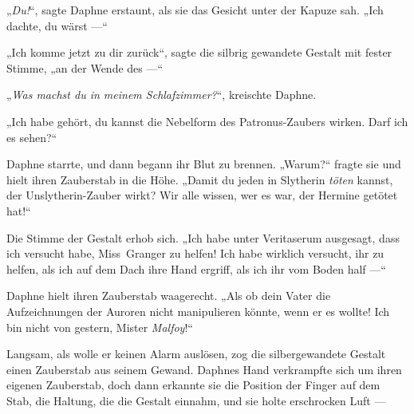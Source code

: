 „\emph{Du!}“, sagte Daphne erstaunt, als sie das Gesicht unter der Kapuze sah.
„Ich dachte, du wärst —“

„Ich komme jetzt zu dir zurück“, sagte die silbrig gewandete Gestalt mit fester Stimme, „an der Wende des —“

„\emph{Was machst du in meinem Schlafzimmer?}“, kreischte Daphne.

„Ich habe gehört, du kannst die Nebelform des Patronus-Zaubers wirken. Darf ich es sehen?“

Daphne starrte, und dann begann ihr Blut zu brennen.
„Warum?“ fragte sie und hielt ihren Zauberstab in die Höhe.
„Damit du jeden in Slytherin \emph{töten} kannst, der Unslytherin-Zauber wirkt? Wir alle wissen, wer es war, der Hermine getötet hat!“

Die Stimme der Gestalt erhob sich.
„Ich habe unter Veritaserum ausgesagt, dass ich versucht habe, Miss~Granger zu helfen! Ich habe wirklich versucht, ihr zu helfen, als ich auf dem Dach ihre Hand ergriff, als ich ihr vom Boden half —“

Daphne hielt ihren Zauberstab waagerecht.
„Als ob dein Vater die Aufzeichnungen der Auroren nicht manipulieren könnte, wenn er es wollte! Ich bin nicht von gestern, Mister \emph{Malfoy}!“

Langsam, als wolle er keinen Alarm auslösen, zog die silbergewandete Gestalt einen Zauberstab aus seinem Gewand. Daphnes Hand verkrampfte sich um ihren eigenen Zauberstab, doch dann erkannte sie die Position der Finger auf dem Stab, die Haltung, die die Gestalt einnahm, und sie holte erschrocken Luft —

